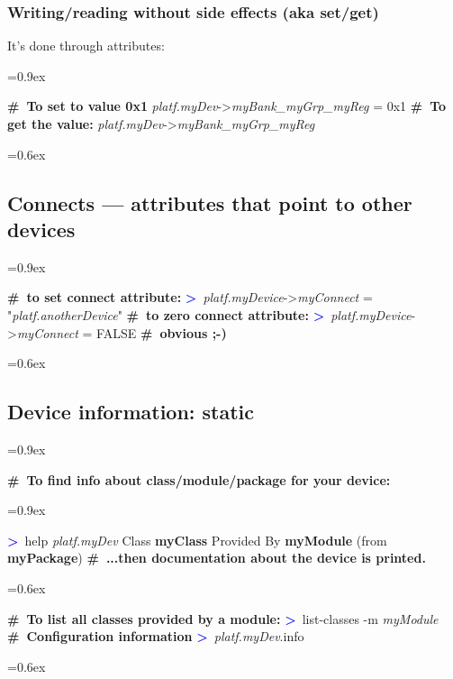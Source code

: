 \documentclass[8pt]{extarticle}
\DeclareRobustCommand{\bseries}{\fontseries{b}\selectfont}
\newenvironment{code}[1][]{%
\begin{prebox}[#1]\obeylines%
\fontdimen2\font=0.9ex%
}{%
\end{prebox}%
\fontdimen2\font=0.6ex%
}
\newcommand{\ind}{\hphantom{~~~}}
\newcommand{\sprompt}{\textcolor{blue}{\textbf{>}\ }}
\newcommand{\cmtcommon}[1]{\textcolor{Sepia}{\textbf{#1}}}
\newcommand{\cmt}[1]{\cmtcommon{\#\ #1}}
\newcommand{\p}[1]{\textit{\large#1}}
\begin{document}
\begin{multicols*}{3}
\subsubsection{Writing/reading {\bseries without} side effects (aka set/get)}

It's done through attributes:
\begin{code}
    \cmt{To set to value 0x1}
    \p{platf.myDev}->\p{myBank_myGrp_myReg} = 0x1
    \cmt{To get the value:}
    \p{platf.myDev}->\p{myBank_myGrp_myReg}
\end{code}

\subsection{Connects — attributes that point to other devices}

\begin{code}
    \cmt{to set connect attribute:}
    \sprompt \p{platf.myDevice}->\p{myConnect} = "\p{platf.anotherDevice}"
    \cmt{to zero connect attribute:}
    \sprompt \p{platf.myDevice}->\p{myConnect} = FALSE \ind\cmt{obvious ;-)}
\end{code}

\subsection{Device information: static}

\begin{code}
    \cmt{To find info about class/module/package for your device:}
    \begin{code}
    \sprompt help \p{platf.myDev}
    \ind Class \textbf{myClass}
    \vspace{0.3em} \ind Provided By
    \ind \ind   \textbf{myModule} (from \textbf{myPackage})
    \vspace{0.2em}
    \ind \cmt{...then documentation about the device is printed.}
    \end{code}
    \vspace{0.3em}

    \cmt{To list all classes provided by a module:}
    \sprompt list-classes -m \p{myModule}
    \cmt{Configuration information}
    \sprompt \p{platf.myDev}.info
\end{code}


\end{multicols*}
\end{document}
